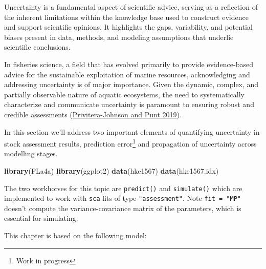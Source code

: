\documentclass[
]{book}
\newenvironment{Shaded}{\begin{snugshade}}{\end{snugshade}}
\newcommand{\FunctionTok}[1]{\textcolor[rgb]{0.13,0.29,0.53}{\textbf{#1}}}
\newcommand{\NormalTok}[1]{#1}
\begin{document}
Uncertainty is a fundamental aspect of scientific advice, serving as a reflection of the inherent limitations within the knowledge base used to construct evidence and support scientific opinions. It highlights the gaps, variability, and potential biases present in data, methods, and modeling assumptions that underlie scientific conclusions.

In fisheries science, a field that has evolved primarily to provide evidence-based advice for the sustainable exploitation of marine resources, acknowledging and addressing uncertainty is of major importance. Given the dynamic, complex, and partially observable nature of aquatic ecosystems, the need to systematically characterize and communicate uncertainty is paramount to ensuring robust and credible assessments (\protect\hyperlink{ref-privitera2019}{Privitera-Johnson and Punt 2019}).

In this section we'll address two important elements of quantifying uncertainty in stock assessment results, prediction error\footnote{Work in progress} and propagation of uncertainty across modelling stages.

\begin{Shaded}
\begin{Highlighting}[]
\FunctionTok{library}\NormalTok{(FLa4a)}
\FunctionTok{library}\NormalTok{(ggplot2)}
\FunctionTok{data}\NormalTok{(hke1567)}
\FunctionTok{data}\NormalTok{(hke1567.idx)}
\end{Highlighting}
\end{Shaded}

The two workhorses for this topic are \texttt{predict()} and \texttt{simulate()} which are implemented to work with \texttt{sca} fits of type \texttt{"assessment"}. Note \texttt{fit\ =\ "MP"} doesn't compute the variance-covariance matrix of the parameters, which is essential for simulating.

This chapter is based on the following model:
\end{document}
